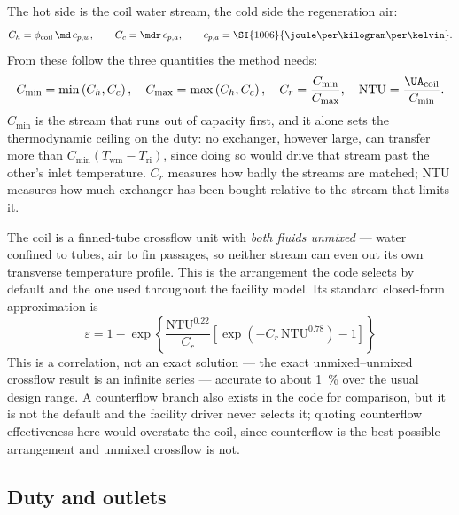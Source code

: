 The hot side is the coil water stream, the cold side the regeneration air:
\begin{equation}
C_h=\phi_{\mathrm{coil}}\,\md\,c_{p,w},
\qquad
C_c=\mdr\,c_{p,a},
\qquad c_{p,a}=\SI{1006}{\joule\per\kilogram\per\kelvin}.
\label{eq:hyd:caprates}
\end{equation}
From these follow the three quantities the method needs:
\begin{equation}
C_{\min}=\min\left(C_h,C_c\right),\quad
C_{\max}=\max\left(C_h,C_c\right),\quad
C_r=\frac{C_{\min}}{C_{\max}},\quad
\mathrm{NTU}=\frac{\UA_{\mathrm{coil}}}{C_{\min}} .
\label{eq:hyd:ntudef}
\end{equation}
$C_{\min}$ is the stream that runs out of capacity first, and it alone sets the thermodynamic
ceiling on the duty: no exchanger, however large, can transfer more than
$C_{\min}(T_{\mathrm{wm}}-T_{\mathrm{ri}})$, since doing so would drive that stream past the
other's inlet temperature. $C_r$ measures how badly the streams are matched; $\mathrm{NTU}$
measures how much exchanger has been bought relative to the stream that limits it.

The coil is a finned-tube crossflow unit with \emph{both fluids unmixed} --- water confined to
tubes, air to fin passages, so neither stream can even out its own transverse temperature
profile. This is the arrangement the code selects by default and the one used throughout the
facility model. Its standard closed-form approximation is
\begin{equation}
\boxed{\;\varepsilon=1-\exp\!\left\{\frac{\mathrm{NTU}^{0.22}}{C_r}
\left[\exp\!\left(-C_r\,\mathrm{NTU}^{0.78}\right)-1\right]\right\}\;}
\label{eq:hyd:epscross}
\end{equation}
This is a correlation, not an exact solution --- the exact unmixed--unmixed crossflow result is
an infinite series --- accurate to about \SI{1}{\percent} over the usual design range. A
counterflow branch also exists in the code for comparison, but it is not the default and the
facility driver never selects it; quoting counterflow effectiveness here would overstate the
coil, since counterflow is the best possible arrangement and unmixed crossflow is not.

\subsection{Duty and outlets}
\label{sec:hyd:duty}

